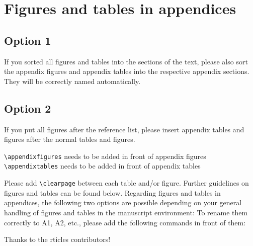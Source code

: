 \documentclass[gc, manuscript]{copernicus}
\begin{document}
\section{Figures and tables in appendices}
\subsection{Option 1}

If you sorted all figures and tables into the sections of the text,
please also sort the appendix figures and appendix tables into the
respective appendix sections. They will be correctly named
automatically.

\subsection{Option 2}

If you put all figures after the reference list, please insert appendix
tables and figures after the normal tables and figures.

\texttt{\textbackslash{}appendixfigures} needs to be added in front of
appendix figures \texttt{\textbackslash{}appendixtables} needs to be
added in front of appendix tables

Please add \texttt{\textbackslash{}clearpage} between each table and/or
figure. Further guidelines on figures and tables can be found below.
Regarding figures and tables in appendices, the following two options
are possible depending on your general handling of figures and tables in
the manuscript environment: To rename them correctly to A1, A2, etc.,
please add the following commands in front of them:
\noappendix




\begin{acknowledgements}
Thanks to the rticles contributors!
\end{acknowledgements}

\end{document}
